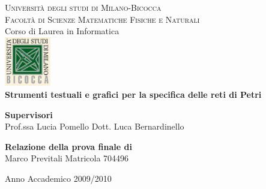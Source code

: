 
\begin{titlepage}
\begin{center}

\textsc{\Large  Università degli studi di Milano-Bicocca}\\[0.7cm]
\textsc{\normalsize Facoltà di Scienze Matematiche Fisiche e Naturali}\\[0.7cm]
{ \normalsize Corso di Laurea in Informatica}\\[1.5cm]

\includegraphics[width=0.15\textwidth]{img/bicocca.jpg}\\[1.5cm]

{\Large \bfseries Strumenti testuali e grafici per la specifica delle reti di Petri}\\[1cm]


\begin{minipage}{0.4\textwidth}
\begin{flushleft} \large
{\bf Supervisori}\\
Prof.ssa Lucia Pomello
Dott. Luca Bernardinello
\end{flushleft}
\end{minipage}
\begin{minipage}{0.4\textwidth}
\begin{flushright} \large
{\bf Relazione della prova finale di} \\
Marco Previtali
Matricola 704496
\end{flushright}
\end{minipage}

\vfill

{\large Anno Accademico 2009/2010}

\end{center}
\end{titlepage}